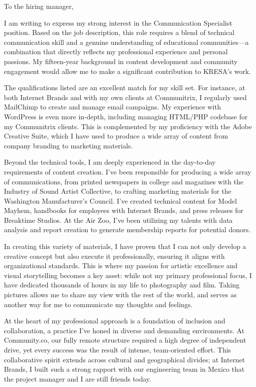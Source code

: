 \documentclass[12pt]{letter} %
\date{June 25, 2025 \vspace{-48pt}} %
\begin{document}
\begin{letter}{}
	\opening{To the hiring manager,}

	I am writing to express my strong interest in the Communication Specialist position. Based on the job description, this role requires a blend of technical communication skill and a genuine understanding of educational communities—a combination that directly reflects my professional experience and personal passions. My fifteen-year background in content development and community engagement would allow me to make a significant contribution to KRESA’s work.

	The qualifications listed are an excellent match for my skill set. For instance, at both Internet Brands and with my own clients at Communitrix, I regularly used MailChimp to create and manage email campaigns. My experience with WordPress is even more in-depth, including managing HTML/PHP codebase for my Communitrix clients. This is complemented by my proficiency with the Adobe Creative Suite, which I have used to produce a wide array of content from company branding to marketing materials.

	Beyond the technical tools, I am deeply experienced in the day-to-day requirements of content creation. I've been responsible for producing a wide array of communications, from printed newspapers in college and magazines with the Industry of Sound Artist Collective, to crafting marketing materials for the Washington Manufacturer’s Council. I've created technical content for Model Mayhem, handbooks for employees with Internet Brands, and press releases for Breaktime Studios. At the Air Zoo, I've been utilizing my talents with data analysis and report creation to generate membership reports for potential donors.
    
    In creating this variety of materials, I have proven that I can not only develop a creative concept but also execute it professionally, ensuring it aligns with organizational standards. This is where my passion for artistic excellence and visual storytelling becomes a key asset: while not my primary professional focus, I have dedicated thousands of hours in my life to photography and film. Taking pictures allows me to share my view with the rest of the world, and serves as another way for me to communicate my thoughts and feelings.

	\newpage
	At the heart of my professional approach is a foundation of inclusion and collaboration, a practice I've honed in diverse and demanding environments. At Community.co, our fully remote structure required a high degree of independent drive, yet every success was the result of intense, team-oriented effort. This collaborative spirit extends across cultural and geographical divides; at Internet Brands, I built such a strong rapport with our engineering team in Mexico that the project manager and I are still friends today.


\end{letter}
\end{document}

